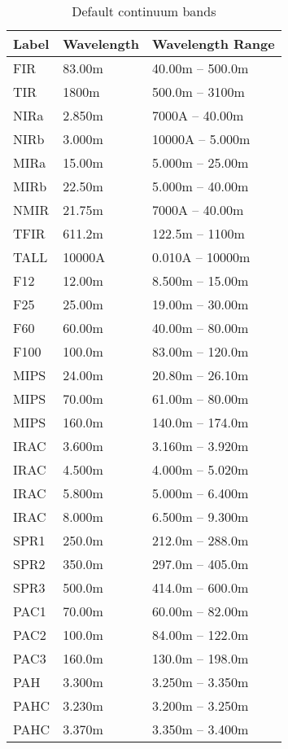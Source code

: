 \begin{table}
\centering
\caption{\label{tab:continuum_bands}Default continuum bands}
\begin{tabular}{lll}
\hline
Label& Wavelength&Wavelength Range\\
\hline
 FIR  & 83.00m & 40.00m -- 500.0m\\ 
 TIR  &  1800m & 500.0m --  3100m\\ 
 NIRa & 2.850m &  7000A -- 40.00m\\ 
 NIRb & 3.000m & 10000A -- 5.000m\\ 
 MIRa & 15.00m & 5.000m -- 25.00m\\ 
 MIRb & 22.50m & 5.000m -- 40.00m\\ 
 NMIR & 21.75m &  7000A -- 40.00m\\ 
 TFIR & 611.2m & 122.5m --  1100m\\ 
 TALL & 10000A & 0.010A -- 10000m\\ 
 F12  & 12.00m & 8.500m -- 15.00m\\ 
 F25  & 25.00m & 19.00m -- 30.00m\\ 
 F60  & 60.00m & 40.00m -- 80.00m\\ 
 F100 & 100.0m & 83.00m -- 120.0m\\ 
 MIPS & 24.00m & 20.80m -- 26.10m\\ 
 MIPS & 70.00m & 61.00m -- 80.00m\\ 
 MIPS & 160.0m & 140.0m -- 174.0m\\ 
 IRAC & 3.600m & 3.160m -- 3.920m\\ 
 IRAC & 4.500m & 4.000m -- 5.020m\\ 
 IRAC & 5.800m & 5.000m -- 6.400m\\ 
 IRAC & 8.000m & 6.500m -- 9.300m\\ 
 SPR1 & 250.0m & 212.0m -- 288.0m\\ 
 SPR2 & 350.0m & 297.0m -- 405.0m\\ 
 SPR3 & 500.0m & 414.0m -- 600.0m\\ 
 PAC1 & 70.00m & 60.00m -- 82.00m\\ 
 PAC2 & 100.0m & 84.00m -- 122.0m\\ 
 PAC3 & 160.0m & 130.0m -- 198.0m\\ 
 PAH  & 3.300m & 3.250m -- 3.350m\\ 
 PAHC & 3.230m & 3.200m -- 3.250m\\ 
 PAHC & 3.370m & 3.350m -- 3.400m\\ 

\end{tabular}
\end{table}

